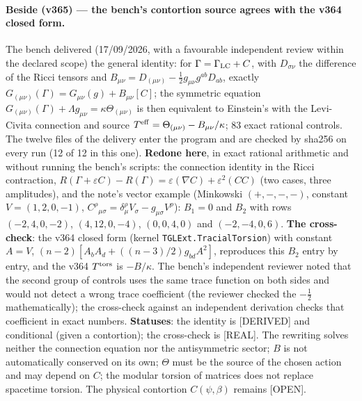 \documentclass[11pt]{article}
\theoremstyle{definition}\newtheorem{deriv}{Derivation}
\begin{document}
\paragraph*{Beside (v365) --- the bench's contortion source agrees with the v364 closed form.} The bench delivered (17/09/2026, with a favourable independent review within the declared scope) the general identity: for $\Gamma=\Gamma_{\rm LC}+C$, with $D_{\sigma\nu}$ the difference of the Ricci tensors and $B_{\mu\nu}=D_{(\mu\nu)}-\tfrac12g_{\mu\nu}g^{ab}D_{ab}$, exactly $G_{(\mu\nu)}(\Gamma)=G_{\mu\nu}(g)+B_{\mu\nu}[C]$; the symmetric equation $G_{(\mu\nu)}(\Gamma)+\Lambda g_{\mu\nu}=\kappa\Theta_{(\mu\nu)}$ is then equivalent to Einstein's with the Levi-Civita connection and source $T^{\rm eff}=\Theta_{(\mu\nu)}-B_{\mu\nu}/\kappa$; 83 exact rational controls. The twelve files of the delivery enter the program and are checked by sha256 on every run (12 of 12 in this one). \textbf{Redone here}, in exact rational arithmetic and without running the bench's scripts: the connection identity in the Ricci contraction, $R(\Gamma+\varepsilon C)-R(\Gamma)=\varepsilon(\nabla C)+\varepsilon^2(CC)$ (two cases, three amplitudes), and the note's vector example (Minkowski $(+,-,-,-)$, constant $V=(1,2,0,-1)$, $C^\rho{}_{\mu\sigma}=\delta^\rho_\mu V_\sigma-g_{\mu\sigma}V^\rho$): $B_1=0$ and $B_2$ with rows $(-2,4,0,-2)$, $(4,12,0,-4)$, $(0,0,4,0)$ and $(-2,-4,0,6)$. \textbf{The cross-check}: the v364 closed form (kernel \texttt{TGLExt.TracialTorsion}) with constant $A=V$, $(n-2)[A_bA_d+((n-3)/2)g_{bd}A^2]$, reproduces this $B_2$ entry by entry, and the v364 $T^{\rm tors}$ is $-B/\kappa$. The bench's independent reviewer noted that the second group of controls uses the same trace function on both sides and would not detect a wrong trace coefficient (the reviewer checked the $-\tfrac12$ mathematically); the cross-check against an independent derivation checks that coefficient in exact numbers. \textbf{Statuses}: the identity is [DERIVED] and conditional (given a contortion); the cross-check is [REAL]. The rewriting solves neither the connection equation nor the antisymmetric sector; $B$ is not automatically conserved on its own; $\Theta$ must be the source of the chosen action and may depend on $C$; the modular torsion of matrices does not replace spacetime torsion. The physical contortion $C(\psi,\beta)$ remains [OPEN].
\end{document}
